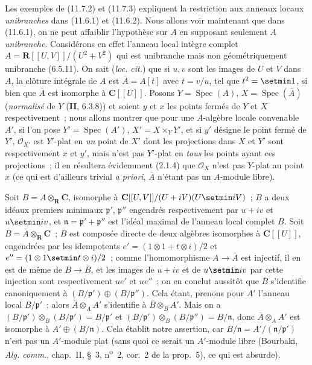 \begin{env}[11.7.5]
Les exemples de (11.7.2) et (11.7.3) expliquent la restriction aux anneaux
locaux \emph{unibranches} dans (11.6.1) et (11.6.2). Nous allons voir maintenant
que dans (11.6.1), on ne peut affaiblir l'hypothèse sur $A$ en supposant
seulement $A$ \emph{unibranche}. Considérons en effet l'anneau local intègre complet
$A=\mathbf R[[U,V]]/(U^2+V^2)$ qui est unibranche mais non géométriquement
unibranche (6.5.11). On sait (\emph{loc. cit.}) que si $u,v$ sont les images de
$U$ et $V$ dans $A$, la clôture intégrale de $A$ est $\overline A=A[t]$ avec
$t=v/u$, tel que $t^2=\setmin 1$, si bien que $\overline A$ est isomorphe à
$\mathbf C[[U]]$. Posons $Y=\operatorname{Spec}(A)$,
$X=\operatorname{Spec}(\overline A)$ (\emph{normalisé} de $Y$ (\textbf{II}, 6.3.8)) et
soient $y$ et $x$ les points fermés de $Y$ et $X$ respectivement~; nous allons
montrer que pour une $A$-algèbre locale convenable $A'$, si l'on pose
$Y'=\operatorname{Spec}(A')$, $X'=X\times_Y Y'$, et si $y'$ désigne le point
fermé de $Y'$, $\mathcal O_{X'}$ est $Y'$-plat en \emph{un} point de $X'$ dont les
projections dans $X$ et $Y'$ sont respectivement $x$ et $y'$, mais n'est pas
$Y'$-plat en \emph{tous} les points ayant ces projections~; il en résultera évidemment
(2.1.4) que $\mathcal O_X$ n'est pas $Y$-plat au point $x$ (ce qui est d'ailleurs
trivial \emph{a priori}, $\overline A$ n'étant pas un $A$-module libre).

Soit $B=A\otimes_{\mathbf R}\mathbf C$, isomorphe à
$\mathbf C[[U,V]]/(U+iV)(U\setmin iV)$~; $B$ a deux idéaux premiers minimaux
$\mathfrak p'$, $\mathfrak p''$ engendrés respectivement par $u+iv$ et $u\setmin iv$,
et $\mathfrak n=\mathfrak p'+\mathfrak p''$ est l'idéal maximal de l'anneau
local complet $B$. Soit $\overline B=\overline A\otimes_{\mathbf R}\mathbf C$~;
$\overline B$ est composée directe de deux algèbres isomorphes à
$\mathbf C[[U]]$, engendrées par les idempotents
$e'=(1\otimes1+t\otimes i)/2$ et $e''=(1\otimes1\setmin t\otimes i)/2$~; comme
l'homomorphisme $A\to\overline A$ est injectif, il en est de même de
$B\to\overline B$, et les images de $u+iv$ et de $u\setmin iv$ par cette injection sont
respectivement $ue'$ et $ue''$~; on en conclut aussitôt que $\overline B$
s'identifie canoniquement à $(B/\mathfrak p')\oplus(B/\mathfrak p'')$. Cela
étant, prenons pour $A'$ l'anneau local $B/\mathfrak p'$~; alors
$\overline A\otimes_A A'$ s'identifie à $\overline B\otimes_B A'$. Mais on a
$(B/\mathfrak p')\otimes_B(B/\mathfrak p')=B/\mathfrak p'$ et
$(B/\mathfrak p')\otimes_B(B/\mathfrak p'')=B/\mathfrak n$, donc
$\overline A\otimes_A A'$ est isomorphe à $A'\oplus(B/\mathfrak n)$. Cela
établit notre assertion, car $B/\mathfrak n=A'/(\mathfrak n/\mathfrak p')$
n'est pas un $A'$-module plat (sans quoi ce serait un $A'$-module libre
(Bourbaki, \emph{Alg. comm.}, chap.~II, \S~3, n\textsuperscript{o}~2, cor.~2 de la
prop.~5), ce qui est absurde).
\end{env}

